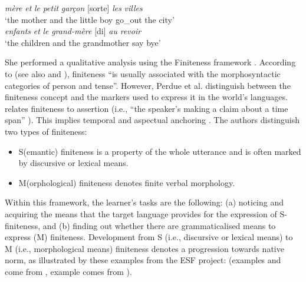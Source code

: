 \documentclass[output=paper,colorlinks,citecolor=brown,modfonts,nonflat]{../langscibook}
\begin{document}
\begin{exe}
\ex%
    \label{ex:leclerq:8}
 {\textit{mère}} {\textit{et}} {\textit{le}} {\textit{petit}} {\textit{garçon}} {[sorte]} {\textit{les}} {\textit{villes}}\\
         ‘the mother and the little boy go\_out the city’\\

\ex%
    \label{ex:leclerq:9}
 {\textit{enfants}} {\textit{et}} {\textit{le}} {\textit{grand-mère}} {[di]} {\textit{au}} {\textit{revoir}}\\
         ‘the children and the grandmother say bye’\\
\end{exe}

She performed a qualitative analysis using the Finiteness framework \citep{Klein2006}. According to \cite[853]{PerdueEtAl2002} (see also \citealt{Klein2006} and \citealt{GretschPerdue2007}), finiteness “is usually associated with the morphosyntactic categories of person and tense”. However, Perdue et al. distinguish between the finiteness concept and the markers used to express it in the world’s languages. \citet{Klein1994} relates finiteness to assertion (i.e., “the speaker’s making a claim about a time span” \citealt[853]{PerdueEtAl2002}). This implies temporal and aspectual anchoring \citep{Klein1994}. The authors distinguish two types of finiteness:

\begin{itemize}
  \item S(emantic) finiteness is a property of the whole utterance and is often marked by discursive or lexical means.
  \item M(orphological) finiteness denotes finite verbal morphology.
\end{itemize}



Within this framework, the learner’s tasks are the following: (a) noticing and acquiring the means that the target language provides for the expression of S-finiteness, and (b) finding out whether there are grammaticalised means to express (M) finiteness. Development from S (i.e., discursive or lexical means) to M (i.e., morphological means) finiteness denotes a progression towards native norm, as illustrated by these examples from the ESF project: (examples  and  come from \citealt[267]{Véronique2004}, example  comes from \citealt[114]{Granget2015}).
\end{document}
